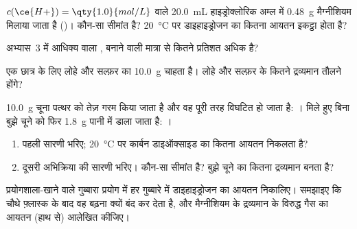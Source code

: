 \begin{exercise}[$\star\star$]\label{exo:g10:reaction-progress-table:10}
$c(\ce{H+}) = \qty{1.0}{mol/L}$ वाले \qty{20.0}{mL} हाइड्रोक्लोरिक अम्ल में
\qty{0.48}{g} मैग्नीशियम मिलाया जाता है
()। कौन-सा  सीमांत है? \qty{20}{\celsius}
पर डाइहाइड्रोजन का कितना आयतन इकट्ठा होता है?
\end{exercise}

\begin{exercise}[$\star\star$]\label{exo:g10:reaction-progress-table:11}
अभ्यास~3 में आधिक्य वाला ,  बनाने वाली मात्रा से
कितने प्रतिशत अधिक है?
\end{exercise}

\begin{exercise}[$\star\star\star$]\label{exo:g10:reaction-progress-table:12}
एक छात्र  के लिए लोहे और सल्फ़र का \qty{10.0}{g}
 चाहता है। लोहे और सल्फ़र के कितने द्रव्यमान
तौलने होंगे?
\end{exercise}

\begin{exercise}[$\star\star\star$]\label{exo:g10:reaction-progress-table:13}
\qty{10.0}{g} चूना पत्थर  को तेज़ गरम किया जाता है और वह पूरी तरह
विघटित हो जाता है: । मिले हुए बिना बुझे चूने  को फिर
\qty{1.8}{g} पानी में डाला जाता है: ।
\begin{enumerate}
  \item पहली  सारणी भरिए; \qty{20}{\celsius} पर कार्बन
        डाइऑक्साइड का कितना आयतन निकलता है?
  \item दूसरी अभिक्रिया की सारणी भरिए। कौन-सा 
        सीमांत है? बुझे चूने  का कितना द्रव्यमान बनता है?
\end{enumerate}
\end{exercise}

\begin{exercise}[$\star\star\star$]\label{exo:g10:reaction-progress-table:14}
प्रयोगशाला-खाने वाले गुब्बारा प्रयोग में हर गुब्बारे में डाइहाइड्रोजन का आयतन
निकालिए। समझाइए कि चौथे फ़्लास्क के बाद वह बढ़ना क्यों बंद कर देता है, और
मैग्नीशियम के द्रव्यमान के विरुद्ध गैस का आयतन (हाथ से) आलेखित
कीजिए।
\end{exercise}

